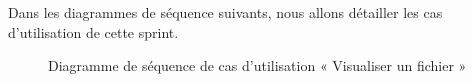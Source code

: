 Dans les diagrammes de séquence suivants, nous allons détailler les cas d'utilisation de cette sprint.\\
\begin{figure}[H]
  \centering
  \caption{Diagramme de séquence de cas d'utilisation « Visualiser un fichier   »}
  \label{fig:sequence_view_file}
\end{figure}


